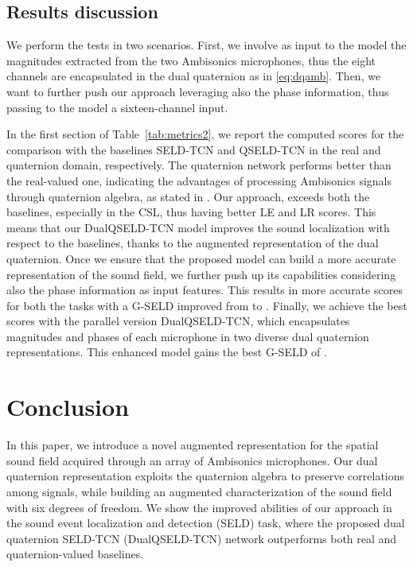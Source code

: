 \documentclass[3p, preprint, twocolumn]{elsarticle}
\begin{document}
\subsection{Results discussion}
We perform the tests in two scenarios. First, we involve as input to the model the magnitudes extracted from the two Ambisonics microphones, thus the eight channels are encapsulated in the dual quaternion as in \eqref{eq:dqamb}. Then, we want to further push our approach leveraging also the phase information, thus passing to the model a sixteen-channel input.

In the first section of Table~\ref{tab:metrics2}, we report the computed scores for the comparison with the baselines SELD-TCN and QSELD-TCN in the real and quaternion domain, respectively. The quaternion network performs better than the real-valued one, indicating the advantages of processing Ambisonics signals through quaternion algebra, as stated in \cite{Brignone2022ISCAS, ComminielloICASSP2019b, QSSL}. Our approach, exceeds both the baselines, especially in the CSL, thus having better LE and LR scores. This means that our DualQSELD-TCN model improves the sound localization with respect to the baselines, thanks to the augmented representation of the dual quaternion. Once we ensure that the proposed model can build a more accurate representation of the sound field, we further push up its capabilities considering also the phase information as input features. This results in more accurate scores for both the tasks with a G-SELD improved from  to . Finally, we achieve the best scores with the parallel version DualQSELD-TCN, which encapsulates magnitudes and phases of each microphone in two diverse dual quaternion representations. This enhanced model gains the best G-SELD of .






\section{Conclusion}
\label{sec:con}

In this paper, we introduce a novel augmented representation for the spatial sound field acquired through an array of Ambisonics microphones. Our dual quaternion representation exploits the quaternion algebra to preserve correlations among signals, while building an augmented characterization of the sound field with six degrees of freedom. We show the improved abilities of our approach in the sound event localization and detection (SELD) task, where the proposed dual quaternion SELD-TCN (DualQSELD-TCN) network outperforms both real and quaternion-valued baselines.
\end{document}
